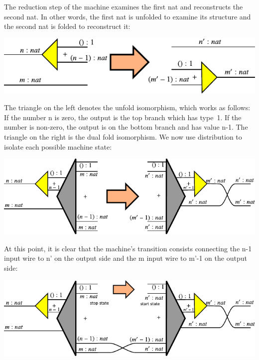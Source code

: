 \documentclass{llncs}
\begin{document}
The reduction step of the machine examines the first {{nat}} and reconstructs
the second {{nat}}. In other words, the first {{nat}} is unfolded to examine
its structure and the second {{nat}} is folded to reconstruct it:

\begin{center}
  \includegraphics{diagrams/nat-nat3.pdf}
\end{center}

The triangle on the left denotes the {{unfold}} isomorphism, which works as
follows: If the number {{n}} is zero, the output is the top branch which has
type~{{1}}. If the number is non-zero, the output is on the bottom branch
and has value {{n-1}}. The triangle on the right is the dual {{fold}}
isomorphism.  We now use distribution to isolate each possible machine state:


\begin{center}
  \includegraphics{diagrams/nat-nat4.pdf}
\end{center}

At this point, it is clear that the machine's transition consists connecting
the {{n-1}} input wire to {{n'}} on the output side and the {{m}} input wire
to {{m'-1}} on the output side:

\begin{center}
  \includegraphics{diagrams/nat-nat5.pdf}
\end{center}
\end{document}
